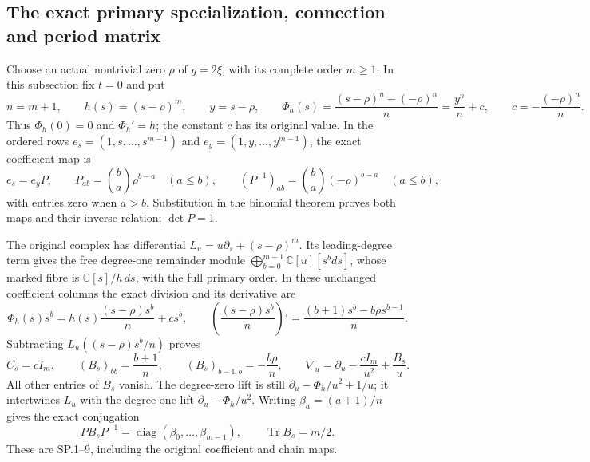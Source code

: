 \documentclass[11pt]{article}
\begin{document}
\subsection{The exact primary specialization, connection and period matrix}

Choose an actual nontrivial zero \(\rho\) of \(g=2\xi\), with its
complete order \(m\geq1\).  In this subsection fix \(t=0\) and put
\[
 n=m+1,\qquad h(s)=(s-\rho)^m,\qquad
 y=s-\rho,\qquad
 \Phi_h(s)=\frac{(s-\rho)^n-(-\rho)^n}{n}
          =\frac{y^n}{n}+c,\qquad
 c=-\frac{(-\rho)^n}{n}.
\]
Thus \(\Phi_h(0)=0\) and \(\Phi_h'=h\); the constant \(c\) has its
original value.  In the ordered rows
\(e_s=(1,s,\ldots,s^{m-1})\) and
\(e_y=(1,y,\ldots,y^{m-1})\), the exact coefficient map is
\[
 e_s=e_yP,\qquad
 P_{ab}=\binom ba\rho^{b-a}\quad(a\leq b),\qquad
 (P^{-1})_{ab}=\binom ba(-\rho)^{b-a}\quad(a\leq b),
\]
with entries zero when \(a>b\).  Substitution in the binomial theorem
proves both maps and their inverse relation; \(\det P=1\).

The original complex has differential
\(L_u=u\partial_s+(s-\rho)^m\).
Its leading-degree term gives the free degree-one remainder module
\(\bigoplus_{b=0}^{m-1}\mathbb C[u][s^bds]\), whose marked fibre is
\(\mathbb C[s]/h\,ds\), with the full primary order.  In these unchanged
coefficient columns the exact division and its derivative are
\[
 \Phi_h(s)s^b
   =h(s)\frac{(s-\rho)s^b}{n}+cs^b,\qquad
 \left(\frac{(s-\rho)s^b}{n}\right)'
   =\frac{(b+1)s^b-b\rho s^{b-1}}n .
\]
Subtracting \(L_u((s-\rho)s^b/n)\) proves
\[
 C_s=cI_m,\qquad
 (B_s)_{bb}=\frac{b+1}{n},\qquad
 (B_s)_{b-1,b}=-\frac{b\rho}{n},\qquad
 \nabla_u=\partial_u-\frac{cI_m}{u^2}+\frac{B_s}{u}.
\]
All other entries of \(B_s\) vanish.  The degree-zero lift is still
\(\partial_u-\Phi_h/u^2+1/u\); it intertwines \(L_u\) with the
degree-one lift \(\partial_u-\Phi_h/u^2\).  Writing
\(\beta_a=(a+1)/n\) gives the exact conjugation
\[
 PB_sP^{-1}=\operatorname{diag}(\beta_0,\ldots,\beta_{m-1}),
 \qquad \operatorname{Tr}B_s=m/2.
\]
These are SP.1--9, including the original coefficient and chain maps.
\end{document}
